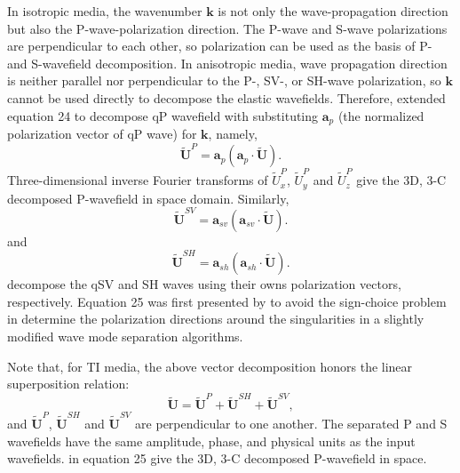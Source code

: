 In isotropic media, the wavenumber $\mathbf{k}$ is not only the wave-propagation direction but also the
P-wave-polarization direction. The P-wave and S-wave polarizations are perpendicular to each other, so
polarization can be used as the basis of P- and S-wavefield decomposition.
In anisotropic media, wave propagation direction is neither parallel nor perpendicular to the P-, SV-,
 or SH-wave polarization, so $\mathbf{k}$ cannot be used directly to decompose the elastic wavefields.
Therefore, \cite{zhang.mcmechan:2010} extended equation 24 to decompose qP wavefield with substituting
 $\mathbf{a}_{p}$ (the normalized polarization vector of qP wave) for $\mathbf{k}$, namely,
\begin{equation}
\tilde{\mathbf{U}}^P = \mathbf{a}_{p}(\mathbf{a}_{p}\cdot\tilde{\mathbf{U}}).
\end{equation}
Three-dimensional inverse Fourier transforms of $\tilde{U}_{x}^{P}$, $\tilde{U}_{y}^{P}$ and $\tilde{U}_{z}^{P}$
give the 3D, 3-C decomposed P-wavefield in space domain. 
Similarly,
\begin{equation}
\tilde{\mathbf{U}}^{SV} = \mathbf{a}_{sv}(\mathbf{a}_{sv}\cdot\tilde{\mathbf{U}}).
\end{equation}
and
\begin{equation}
\tilde{\mathbf{U}}^{SH} = \mathbf{a}_{sh}(\mathbf{a}_{sh}\cdot\tilde{\mathbf{U}}).
\end{equation}
decompose the qSV and SH waves using their owns polarization vectors, respectively.
Equation 25 was first presented by \cite{dellinger.thesis} to avoid the sign-choice problem in determine
the polarization directions around the singularities in a slightly modified wave mode separation algorithms.

Note that, for TI media, the above vector decomposition honors the linear superposition relation:
\begin{equation}
\tilde{\mathbf{U}} = \tilde{\mathbf{U}}^{P} + \tilde{\mathbf{U}}^{SH} + \tilde{\mathbf{U}}^{SV},
\end{equation}
and $\tilde{\mathbf{U}}^{P}$, $\tilde{\mathbf{U}}^{SH}$ and $\tilde{\mathbf{U}}^{SV}$ are perpendicular to one another.
The separated P and S wavefields have the same amplitude, phase, and physical units as the input wavefields.
in equation 25 give the 3D, 3-C decomposed P-wavefield in space.

